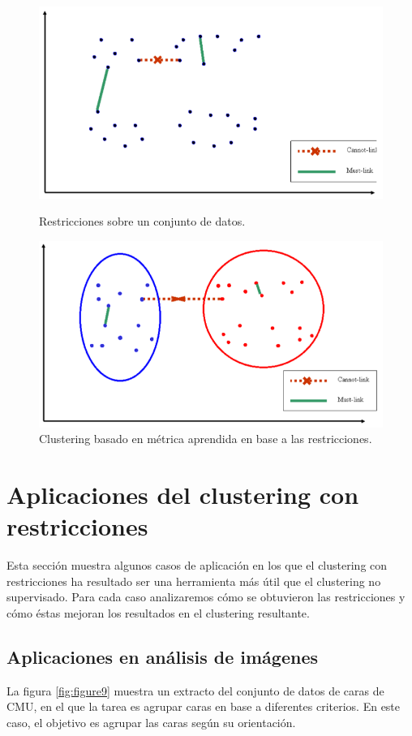 \begin{figure}[bth]
	\myfloatalign
	{\includegraphics[width=.6\linewidth]{imagenes/c3/InputInstancesAndConst2}
	\caption[Restricciones sobre un conjunto de datos.]{Restricciones sobre un conjunto de datos. \cite{Survey:2007}} \label{fig:figure7}
	}
	{\includegraphics[width=.6\linewidth]{imagenes/c3/MetricaAprendida}
	\caption[Clustering basado en métrica aprendida en base a las restricciones.]{Clustering basado en métrica aprendida en base a las restricciones. \cite{Survey:2007}} \label{fig:figure8}
	}
\end{figure}

\section{Aplicaciones del clustering con restricciones} 

Esta sección muestra algunos casos de aplicación en los que el clustering con restricciones ha resultado ser una herramienta más útil que el clustering no supervisado. Para cada caso analizaremos cómo se obtuvieron las restricciones y cómo éstas mejoran los resultados en el clustering resultante. 

\subsection{Aplicaciones en análisis de imágenes}

La figura \ref{fig:figure9} muestra un extracto del conjunto de datos de caras de  \acf{CMU}, en el que la tarea es agrupar caras en base a diferentes criterios. En este caso, el objetivo es agrupar las caras según su orientación.


